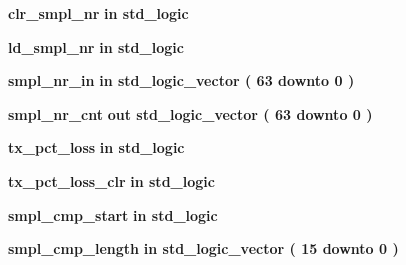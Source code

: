 \begin{DoxyCompactItemize}
\item 
{\bf clr\+\_\+smpl\+\_\+nr}  {\bfseries {\bfseries \textcolor{keywordflow}{in}\textcolor{vhdlchar}{ }}} {\bfseries \textcolor{comment}{std\+\_\+logic}\textcolor{vhdlchar}{ }} 
\item 
{\bf ld\+\_\+smpl\+\_\+nr}  {\bfseries {\bfseries \textcolor{keywordflow}{in}\textcolor{vhdlchar}{ }}} {\bfseries \textcolor{comment}{std\+\_\+logic}\textcolor{vhdlchar}{ }} 
\item 
{\bf smpl\+\_\+nr\+\_\+in}  {\bfseries {\bfseries \textcolor{keywordflow}{in}\textcolor{vhdlchar}{ }}} {\bfseries \textcolor{comment}{std\+\_\+logic\+\_\+vector}\textcolor{vhdlchar}{ }\textcolor{vhdlchar}{(}\textcolor{vhdlchar}{ }\textcolor{vhdlchar}{ } \textcolor{vhdldigit}{63} \textcolor{vhdlchar}{ }\textcolor{keywordflow}{downto}\textcolor{vhdlchar}{ }\textcolor{vhdlchar}{ } \textcolor{vhdldigit}{0} \textcolor{vhdlchar}{ }\textcolor{vhdlchar}{)}\textcolor{vhdlchar}{ }} 
\item 
{\bf smpl\+\_\+nr\+\_\+cnt}  {\bfseries {\bfseries \textcolor{keywordflow}{out}\textcolor{vhdlchar}{ }}} {\bfseries \textcolor{comment}{std\+\_\+logic\+\_\+vector}\textcolor{vhdlchar}{ }\textcolor{vhdlchar}{(}\textcolor{vhdlchar}{ }\textcolor{vhdlchar}{ } \textcolor{vhdldigit}{63} \textcolor{vhdlchar}{ }\textcolor{keywordflow}{downto}\textcolor{vhdlchar}{ }\textcolor{vhdlchar}{ } \textcolor{vhdldigit}{0} \textcolor{vhdlchar}{ }\textcolor{vhdlchar}{)}\textcolor{vhdlchar}{ }} 
\item 
{\bf tx\+\_\+pct\+\_\+loss}  {\bfseries {\bfseries \textcolor{keywordflow}{in}\textcolor{vhdlchar}{ }}} {\bfseries \textcolor{comment}{std\+\_\+logic}\textcolor{vhdlchar}{ }} 
\item 
{\bf tx\+\_\+pct\+\_\+loss\+\_\+clr}  {\bfseries {\bfseries \textcolor{keywordflow}{in}\textcolor{vhdlchar}{ }}} {\bfseries \textcolor{comment}{std\+\_\+logic}\textcolor{vhdlchar}{ }} 
\item 
{\bf smpl\+\_\+cmp\+\_\+start}  {\bfseries {\bfseries \textcolor{keywordflow}{in}\textcolor{vhdlchar}{ }}} {\bfseries \textcolor{comment}{std\+\_\+logic}\textcolor{vhdlchar}{ }} 
\item 
{\bf smpl\+\_\+cmp\+\_\+length}  {\bfseries {\bfseries \textcolor{keywordflow}{in}\textcolor{vhdlchar}{ }}} {\bfseries \textcolor{comment}{std\+\_\+logic\+\_\+vector}\textcolor{vhdlchar}{ }\textcolor{vhdlchar}{(}\textcolor{vhdlchar}{ }\textcolor{vhdlchar}{ } \textcolor{vhdldigit}{15} \textcolor{vhdlchar}{ }\textcolor{keywordflow}{downto}\textcolor{vhdlchar}{ }\textcolor{vhdlchar}{ } \textcolor{vhdldigit}{0} \textcolor{vhdlchar}{ }\textcolor{vhdlchar}{)}\textcolor{vhdlchar}{ }} 

\end{DoxyCompactItemize}
